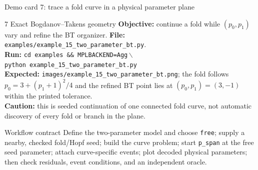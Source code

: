\begin{frame}{Demo card 7: trace a fold curve in a physical parameter plane}
\scriptsize
\begin{block}{7 \quad Exact Bogdanov--Takens geometry}
\textbf{Objective:} continue a fold while $(p_0,p_1)$ vary and refine the BT organizer.\quad
\textbf{File:} \texttt{examples/example\_15\_two\_parameter\_bt.py}.\\
\textbf{Run:} \texttt{cd examples \&\& MPLBACKEND=Agg}\,$\backslash$\\
\hspace*{8mm}\texttt{python example\_15\_two\_parameter\_bt.py}\\
\textbf{Expected:} \texttt{images/example\_15\_two\_parameter\_bt.png}; the
fold follows $p_0=3+(p_1+1)^2/4$ and the refined BT point lies at
$(p_0,p_1)=(3,-1)$ within the printed tolerance.\\
\textbf{Caution:} this is seeded continuation of one connected fold curve,
not automatic discovery of every fold or branch in the plane.
\end{block}

\begin{alertblock}{Workflow contract}
Define the two-parameter model and choose \texttt{free}; supply a nearby,
checked fold/Hopf seed; build the curve problem; start \texttt{p\_span} at
the free seed parameter; attach curve-specific events; plot decoded physical
parameters; then check residuals, event conditions, and an independent oracle.
\end{alertblock}
\end{frame}

